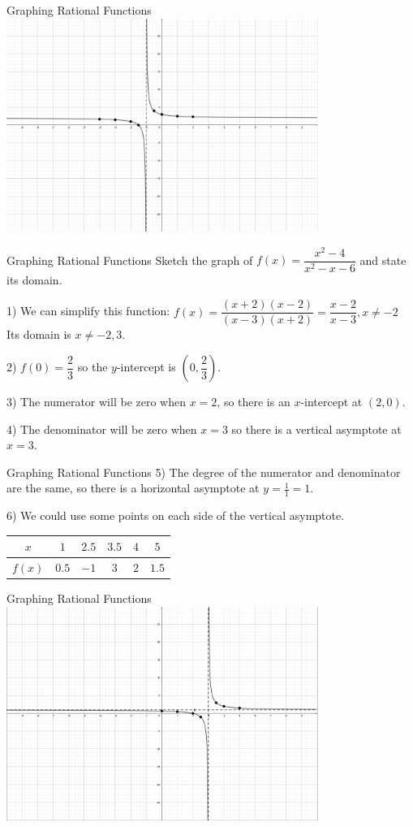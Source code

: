 \documentclass[t, aspectratio=169]{beamer}
\newcommand{\fp}[1]{\left({#1}\right)} %
\begin{document}
	\begin{frame}{Graphing Rational Functions}
		\includegraphics[width=4in]{Rat2.png}
	\end{frame}

	\begin{frame}{Graphing Rational Functions}
		Sketch the graph of $f(x) = \dfrac{x^2 - 4}{x^2 - x - 6}$ and state its domain. \pause
		
		1) We can simplify this function: $f(x) = \dfrac{(x+2)(x-2)}{(x-3)(x+2)} = \dfrac{x-2}{x-3}, x\neq -2$ \\
		Its domain is $x \neq -2, 3$. \pause
		
		2) $f(0) = \dfrac23$ so the $y$-intercept is $\fp{0,\dfrac23}$. \pause
		
		3) The numerator will be zero when $x = 2$, so there is an $x$-intercept at $(2,0)$. \pause
		
		4) The denominator will be zero when $x = 3$ so there is a vertical asymptote at $x = 3$.
	\end{frame}

	\begin{frame}{Graphing Rational Functions}
		5) The degree of the numerator and denominator are the same, so there is a horizontal asymptote at $y = \frac{1}{1} = 1$. \pause
		
		6) We could use some points on each side of the vertical asymptote. \pause
		
		\begin{tabular}{c|ccccc}
			$x$ & $1$ & $2.5$ & $3.5$ & $4$ & $5$ \\ \hline
			$f(x)$ & $0.5$ & $-1$ & $3$ & $2$ & $1.5$
		\end{tabular}
	\end{frame}

	\begin{frame}{Graphing Rational Functions}
		\includegraphics[width=4in]{Rat3.png}
	\end{frame}
\end{document}
